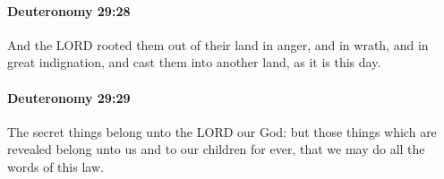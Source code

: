 		\paragraph{Deuteronomy 29:28} %
			\label{DEUTERONOMY-29-28}

			And the LORD rooted them out of their land in anger, and in wrath, and in great indignation, and cast them into another land, as it is this day.


		\paragraph{Deuteronomy 29:29} %
			\label{DEUTERONOMY-29-29}

			The secret things belong unto the LORD our God: but those things which are revealed belong unto us and to our children for ever, that we may do all the words of this law.

